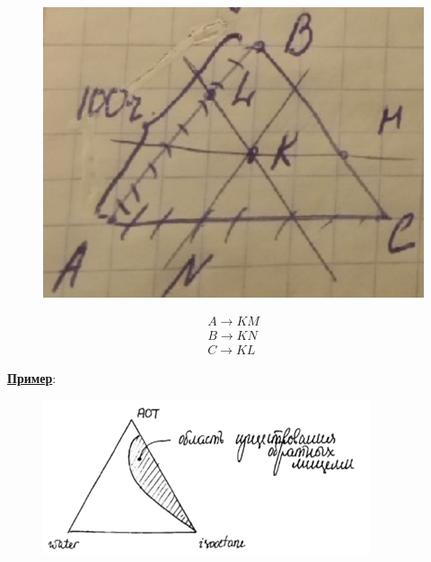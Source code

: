 \begin{lecture}
	\begin{lecSection}
		\begin{figure}
			\centering\includegraphics[width=\linewidth]{lecture_08/triangle_rozebum}
			\label{fig:triangle_rozebum}
		\end{figure}
	\begin{gather*}
		A \rightarrow KM \\
		B \rightarrow KN \\
		C \rightarrow KL
	\end{gather*}
	
	\centering\underline{\textbf{Пример}}:
	\begin{figure}[H]
		\centering\includegraphics[width=0.7\linewidth]{lecture_08/new_triangle_example}
		\label{fig:triangle_example}
	\end{figure}
	\end{lecSection}
	

\end{lecture}
